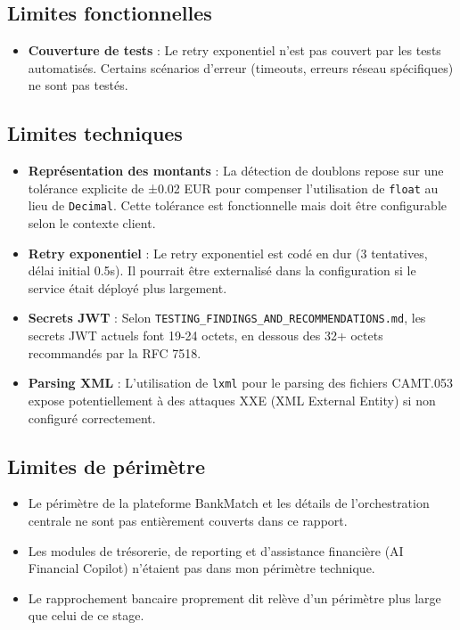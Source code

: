 \documentclass[12pt,a4paper]{extreport}
\begin{document}
\subsection{Limites fonctionnelles}

\begin{itemize}
    \item \textbf{Couverture de tests} : Le retry exponentiel n'est pas couvert par les tests automatisés. Certains scénarios d'erreur (timeouts, erreurs réseau spécifiques) ne sont pas testés.
\end{itemize}

\subsection{Limites techniques}

\begin{itemize}
    \item \textbf{Représentation des montants} : La détection de doublons repose sur une tolérance explicite de ±0.02 EUR pour compenser l'utilisation de \texttt{float} au lieu de \texttt{Decimal}. Cette tolérance est fonctionnelle mais doit être configurable selon le contexte client.
    \item \textbf{Retry exponentiel} : Le retry exponentiel est codé en dur (3 tentatives, délai initial 0.5s). Il pourrait être externalisé dans la configuration si le service était déployé plus largement.
    \item \textbf{Secrets JWT} : Selon \texttt{TESTING\_FINDINGS\_AND\_RECOMMENDATIONS.md}, les secrets JWT actuels font 19-24 octets, en dessous des 32+ octets recommandés par la RFC 7518.
    \item \textbf{Parsing XML} : L'utilisation de \texttt{lxml} pour le parsing des fichiers CAMT.053 expose potentiellement à des attaques XXE (XML External Entity) si non configuré correctement.
\end{itemize}

\subsection{Limites de périmètre}

\begin{itemize}
    \item Le périmètre de la plateforme BankMatch et les détails de l'orchestration centrale ne sont pas entièrement couverts dans ce rapport.
    \item Les modules de trésorerie, de reporting et d'assistance financière (AI Financial Copilot) n'étaient pas dans mon périmètre technique.
    \item Le rapprochement bancaire proprement dit relève d'un périmètre plus large que celui de ce stage.
\end{itemize}
\end{document}
